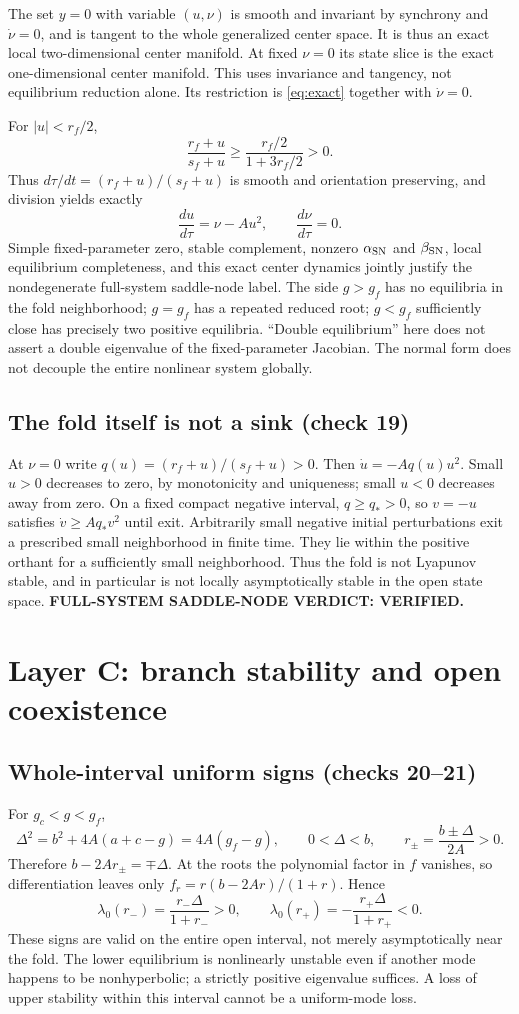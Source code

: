 \documentclass[11pt]{article}
\begin{document}
The set $y=0$ with variable $(u,\nu)$ is smooth and invariant by synchrony
and $\dot\nu=0$, and is tangent to the whole generalized center space.
It is thus an exact local two-dimensional center manifold. At fixed $\nu=0$
its state slice is the exact one-dimensional center manifold. This uses
invariance and tangency, not equilibrium reduction alone. Its restriction
is \eqref{eq:exact} together with $\dot\nu=0$.

For $|u|<r_f/2$,
\[
 \frac{r_f+u}{s_f+u}\ge\frac{r_f/2}{1+3r_f/2}>0.
\]
Thus $d\tau/dt=(r_f+u)/(s_f+u)$ is smooth and orientation preserving,
and division yields exactly
\[
 \frac{du}{d\tau}=\nu-Au^2,\qquad\frac{d\nu}{d\tau}=0.
\]
Simple fixed-parameter zero, stable complement, nonzero $\alpha_{\rm SN}$
and $\beta_{\rm SN}$, local equilibrium completeness, and this exact center
dynamics jointly justify the nondegenerate full-system saddle-node label.
The side $g>g_f$ has no equilibria in the fold neighborhood; $g=g_f$ has
a repeated reduced root; $g<g_f$ sufficiently close has precisely two positive
equilibria. ``Double equilibrium'' here does not assert a double eigenvalue
of the fixed-parameter Jacobian. The normal form does not decouple the entire
nonlinear system globally.

\subsection{The fold itself is not a sink (check 19)}
At $\nu=0$ write $q(u)=(r_f+u)/(s_f+u)>0$. Then
$\dot u=-Aq(u)u^2$. Small $u>0$ decreases to zero, by monotonicity and
uniqueness; small $u<0$ decreases away from zero. On a fixed compact negative
interval, $q\ge q_*>0$, so $v=-u$ satisfies $\dot v\ge Aq_*v^2$ until
exit. Arbitrarily small negative initial perturbations exit a prescribed
small neighborhood in finite time. They lie within the positive orthant for
a sufficiently small neighborhood. Thus the fold is not Lyapunov stable,
and in particular is not locally asymptotically stable in the open state
space. \textbf{FULL-SYSTEM SADDLE-NODE VERDICT: VERIFIED.}

\section{Layer C: branch stability and open coexistence}
\label{sec:C}
\subsection{Whole-interval uniform signs (checks 20--21)}
For $g_c<g<g_f$,
\[
 \Delta^2=b^2+4A(a+c-g)=4A(g_f-g),\qquad 0<\Delta<b,
 \qquad r_\pm=\frac{b\pm\Delta}{2A}>0.
\]
Therefore $b-2Ar_\pm=\mp\Delta$. At the roots the polynomial factor
in $f$ vanishes, so differentiation leaves only
$f_r=r(b-2Ar)/(1+r)$. Hence
\[
 \lambda_0(r_-)=\frac{r_-\Delta}{1+r_-}>0,\qquad
 \lambda_0(r_+)=-\frac{r_+\Delta}{1+r_+}<0.
\]
These signs are valid on the entire open interval, not merely asymptotically
near the fold. The lower equilibrium is nonlinearly unstable even if another
mode happens to be nonhyperbolic; a strictly positive eigenvalue suffices.
A loss of upper stability within this interval cannot be a uniform-mode loss.
\end{document}
